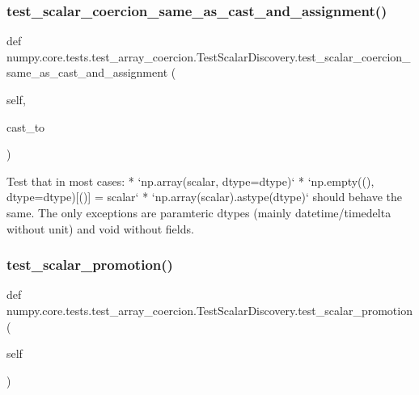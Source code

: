 \subsubsection{\texorpdfstring{test\+\_\+scalar\+\_\+coercion\+\_\+same\+\_\+as\+\_\+cast\+\_\+and\+\_\+assignment()}{test\_scalar\_coercion\_same\_as\_cast\_and\_assignment()}}
{\footnotesize\ttfamily def numpy.\+core.\+tests.\+test\+\_\+array\+\_\+coercion.\+Test\+Scalar\+Discovery.\+test\+\_\+scalar\+\_\+coercion\+\_\+same\+\_\+as\+\_\+cast\+\_\+and\+\_\+assignment (\begin{DoxyParamCaption}\item[{}]{self,  }\item[{}]{cast\+\_\+to }\end{DoxyParamCaption})}

\begin{DoxyVerb}Test that in most cases:
   * `np.array(scalar, dtype=dtype)`
   * `np.empty((), dtype=dtype)[()] = scalar`
   * `np.array(scalar).astype(dtype)`
should behave the same.  The only exceptions are paramteric dtypes
(mainly datetime/timedelta without unit) and void without fields.
\end{DoxyVerb}
 \mbox{\label{classnumpy_1_1core_1_1tests_1_1test__array__coercion_1_1TestScalarDiscovery_a750fc491fc9efec84b0c9d65715818b6}} 
\subsubsection{\texorpdfstring{test\+\_\+scalar\+\_\+promotion()}{test\_scalar\_promotion()}}
{\footnotesize\ttfamily def numpy.\+core.\+tests.\+test\+\_\+array\+\_\+coercion.\+Test\+Scalar\+Discovery.\+test\+\_\+scalar\+\_\+promotion (\begin{DoxyParamCaption}\item[{}]{self }\end{DoxyParamCaption})}

